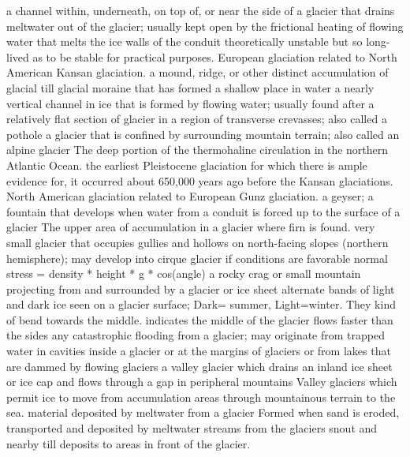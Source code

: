  a channel within, underneath, on top of, or near the side of a glacier that drains meltwater out of the glacier; usually kept open by the frictional heating of flowing water that melts the ice walls of the conduit
 theoretically unstable but so long-lived as to be stable for practical purposes.
 European glaciation related to North American Kansan glaciation.
 a mound, ridge, or other distinct accumulation of glacial till
 glacial moraine that has formed a shallow place in water
 a nearly vertical channel in ice that is formed by flowing water; usually found after a relatively flat section of glacier in a region of transverse crevasses; also called a pothole
 a glacier that is confined by surrounding mountain terrain; also called an alpine glacier
 The deep portion of the thermohaline circulation in the northern Atlantic Ocean.
 the earliest Pleistocene glaciation for which there is ample evidence for, it occurred about 650,000 years ago before the Kansan glaciations. North American glaciation related to European Gunz glaciation.
 a geyser; a fountain that develops when water from a conduit is forced up to the surface of a glacier
 The upper area of accumulation in a glacier where firn is found.
 very small glacier that occupies gullies and hollows on north-facing slopes (northern hemisphere); may develop into cirque glacier if conditions are favorable
 normal stress = density * height * g * cos(angle)
 a rocky crag or small mountain projecting from and surrounded by a glacier or ice sheet
 alternate bands of light and dark ice seen on a glacier surface; Dark= summer, Light=winter. They kind of bend towards the middle. indicates the middle of the glacier flows faster than the sides
 any catastrophic flooding from a glacier; may originate from trapped water in cavities inside a glacier or at the margins of glaciers or from lakes that are dammed by flowing glaciers
 a valley glacier which drains an inland ice sheet or ice cap and flows through a gap in peripheral mountains
 Valley glaciers which permit ice to move from accumulation areas through mountainous terrain to the sea.
 material deposited by meltwater from a glacier
 Formed when sand is eroded, transported and deposited by meltwater streams from the glaciers snout and nearby till deposits to areas in front of the glacier.
